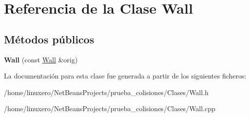 \hypertarget{classWall}{\section{Referencia de la Clase Wall}
\label{classWall}
}
\subsection*{Métodos públicos}
\begin{DoxyCompactItemize}
\item 
\hypertarget{classWall_aa8ed05a8b1a3b3a3147ea7d9344fda83}{{\bfseries Wall} (const \hyperlink{classWall}{Wall} \&orig)}\label{classWall_aa8ed05a8b1a3b3a3147ea7d9344fda83}

\end{DoxyCompactItemize}


La documentación para esta clase fue generada a partir de los siguientes ficheros\-:\begin{DoxyCompactItemize}
\item 
/home/linuxero/\-Net\-Beans\-Projects/prueba\-\_\-colisiones/\-Clases/Wall.\-h\item 
/home/linuxero/\-Net\-Beans\-Projects/prueba\-\_\-colisiones/\-Clases/Wall.\-cpp\end{DoxyCompactItemize}
